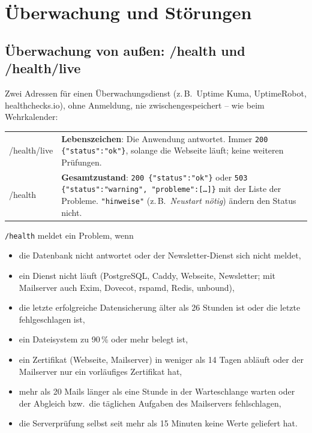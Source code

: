 \documentclass[a4paper,fontsize=10pt]{scrartcl}
\newcommand*{\cmd}[1]{\texttt{#1}}
\begin{document}
\section{Überwachung und Störungen}\label{sec:stoerungen}

\subsection{Überwachung von außen: /health und /health/live}\label{sec:health}

Zwei Adressen für einen Überwachungsdienst (z.\,B.\ Uptime Kuma, UptimeRobot,
healthchecks.io), ohne Anmeldung, nie zwischengespeichert -- wie beim Wehrkalender:

\begin{center}
\small
\begin{tabularx}{\textwidth}{@{}>{\ttfamily\raggedright}p{42mm}X@{}}
\toprule
/health/live & \textbf{Lebenszeichen}: Die Anwendung antwortet. Immer
               \cmd{200 \{"status":"ok"\}}, solange die Webseite läuft; keine
               weiteren Prüfungen. \\
/health      & \textbf{Gesamtzustand}: \cmd{200 \{"status":"ok"\}} oder
               \cmd{503 \{"status":"warning", "probleme":[\dots]\}} mit der Liste der
               Probleme. \cmd{"hinweise"} (z.\,B.\ \emph{Neustart nötig}) ändern den
               Status nicht. \\
\bottomrule
\end{tabularx}
\end{center}

\cmd{/health} meldet ein Problem, wenn
\begin{itemize}
  \item die Datenbank nicht antwortet oder der Newsletter-Dienst sich nicht meldet,
  \item ein Dienst nicht läuft (PostgreSQL, Caddy, Webseite, Newsletter; mit
        Mailserver auch Exim, Dovecot, rspamd, Redis, unbound),
  \item die letzte erfolgreiche Datensicherung älter als 26 Stunden ist oder die
        letzte fehlgeschlagen ist,
  \item ein Dateisystem zu 90\,\% oder mehr belegt ist,
  \item ein Zertifikat (Webseite, Mailserver) in weniger als 14 Tagen abläuft oder
        der Mailserver nur ein vorläufiges Zertifikat hat,
  \item mehr als 20 Mails länger als eine Stunde in der Warteschlange warten oder
        der Abgleich bzw.\ die täglichen Aufgaben des Mailservers fehlschlagen,
  \item die Serverprüfung selbst seit mehr als 15 Minuten keine Werte geliefert hat.
\end{itemize}
\end{document}
